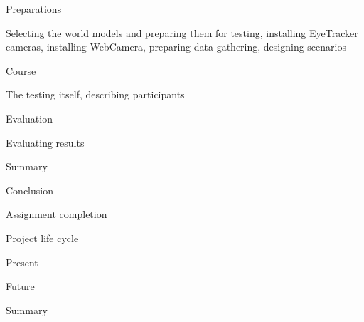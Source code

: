 \seccc Preparations

Selecting the world models and preparing them for testing, installing EyeTracker cameras, installing WebCamera, preparing data gathering, designing scenarios

\seccc Course

The testing itself, describing participants

\seccc Evaluation

Evaluating results

\sec Summary


\chap Conclusion


\sec Assignment completion


\sec Project life cycle


\secc Present


\secc Future


\sec Summary



\bye